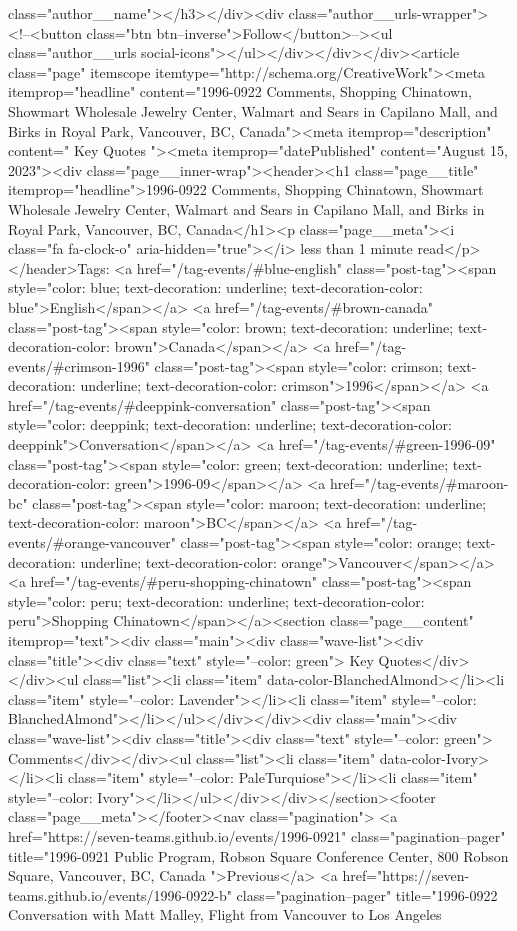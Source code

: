 class="author__name"></h3></div><div class="author__urls-wrapper"> <!--<button class="btn btn--inverse">Follow</button>--><ul class="author__urls social-icons"></ul></div></div></div><article class="page" itemscope itemtype="http://schema.org/CreativeWork"><meta itemprop="headline" content="1996-0922 Comments, Shopping Chinatown, Showmart Wholesale Jewelry Center, Walmart and Sears in Capilano Mall, and Birks in Royal Park, Vancouver, BC, Canada"><meta itemprop="description" content=" Key Quotes "><meta itemprop="datePublished" content="August 15, 2023"><div class="page__inner-wrap"><header><h1 class="page__title" itemprop="headline">1996-0922 Comments, Shopping Chinatown, Showmart Wholesale Jewelry Center, Walmart and Sears in Capilano Mall, and Birks in Royal Park, Vancouver, BC, Canada</h1><p class="page__meta"><i class="fa fa-clock-o" aria-hidden="true"></i> less than 1 minute read</p></header>Tags: <a href="/tag-events/#blue-english" class="post-tag"><span style="color: blue; text-decoration: underline; text-decoration-color: blue">English</span></a> <a href="/tag-events/#brown-canada" class="post-tag"><span style="color: brown; text-decoration: underline; text-decoration-color: brown">Canada</span></a> <a href="/tag-events/#crimson-1996" class="post-tag"><span style="color: crimson; text-decoration: underline; text-decoration-color: crimson">1996</span></a> <a href="/tag-events/#deeppink-conversation" class="post-tag"><span style="color: deeppink; text-decoration: underline; text-decoration-color: deeppink">Conversation</span></a> <a href="/tag-events/#green-1996-09" class="post-tag"><span style="color: green; text-decoration: underline; text-decoration-color: green">1996-09</span></a> <a href="/tag-events/#maroon-bc" class="post-tag"><span style="color: maroon; text-decoration: underline; text-decoration-color: maroon">BC</span></a> <a href="/tag-events/#orange-vancouver" class="post-tag"><span style="color: orange; text-decoration: underline; text-decoration-color: orange">Vancouver</span></a> <a href="/tag-events/#peru-shopping-chinatown" class="post-tag"><span style="color: peru; text-decoration: underline; text-decoration-color: peru">Shopping Chinatown</span></a><section class="page__content" itemprop="text"><div class="main"><div class="wave-list"><div class="title"><div class="text" style="--color: green"> Key Quotes</div></div><ul class="list"><li class="item" data-color-BlanchedAlmond></li><li class="item" style="--color: Lavender"></li><li class="item" style="--color: BlanchedAlmond"></li></ul></div></div><div class="main"><div class="wave-list"><div class="title"><div class="text" style="--color: green"> Comments</div></div><ul class="list"><li class="item" data-color-Ivory></li><li class="item" style="--color: PaleTurquiose"></li><li class="item" style="--color: Ivory"></li></ul></div></div></section><footer class="page__meta"></footer><nav class="pagination"> <a href="https://seven-teams.github.io/events/1996-0921" class="pagination--pager" title="1996-0921 Public Program, Robson Square Conference Center, 800 Robson Square, Vancouver, BC, Canada ">Previous</a> <a href="https://seven-teams.github.io/events/1996-0922-b" class="pagination--pager" title="1996-0922 Conversation with Matt Malley, Flight from Vancouver to Los Angeles 